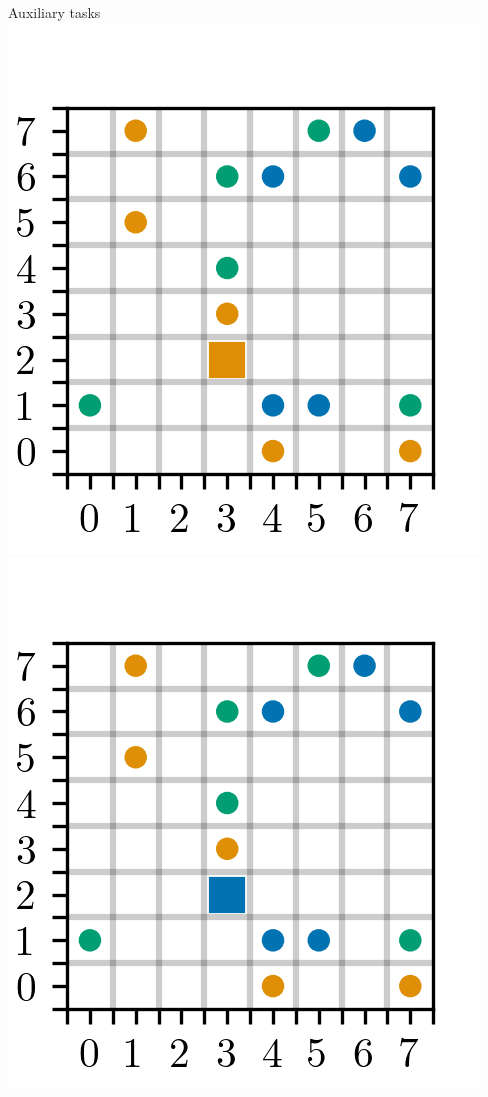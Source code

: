 \documentclass[10pt]{beamer}
\begin{document}
\begin{frame}{Auxiliary tasks}
  \centering
  \includegraphics[scale=0.8]{"figures/5x5.png"} \\
  \includegraphics[scale=0.8]{"./figures/aux_1.png"} 

\end{frame}
\end{document}

